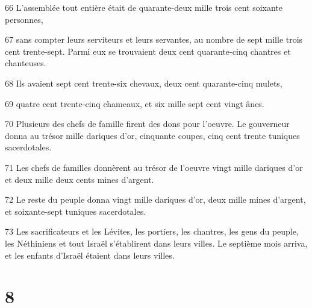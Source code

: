 \par 66 L'assemblée tout entière était de quarante-deux mille trois cent soixante personnes,
\par 67 sans compter leurs serviteurs et leurs servantes, au nombre de sept mille trois cent trente-sept. Parmi eux se trouvaient deux cent quarante-cinq chantres et chanteuses.
\par 68 Ils avaient sept cent trente-six chevaux, deux cent quarante-cinq mulets,
\par 69 quatre cent trente-cinq chameaux, et six mille sept cent vingt ânes.
\par 70 Plusieurs des chefs de famille firent des dons pour l'oeuvre. Le gouverneur donna au trésor mille dariques d'or, cinquante coupes, cinq cent trente tuniques sacerdotales.
\par 71 Les chefs de familles donnèrent au trésor de l'oeuvre vingt mille dariques d'or et deux mille deux cents mines d'argent.
\par 72 Le reste du peuple donna vingt mille dariques d'or, deux mille mines d'argent, et soixante-sept tuniques sacerdotales.
\par 73 Les sacrificateurs et les Lévites, les portiers, les chantres, les gens du peuple, les Néthiniens et tout Israël s'établirent dans leurs villes. Le septième mois arriva, et les enfants d'Israël étaient dans leurs villes.

\chapter{8}

